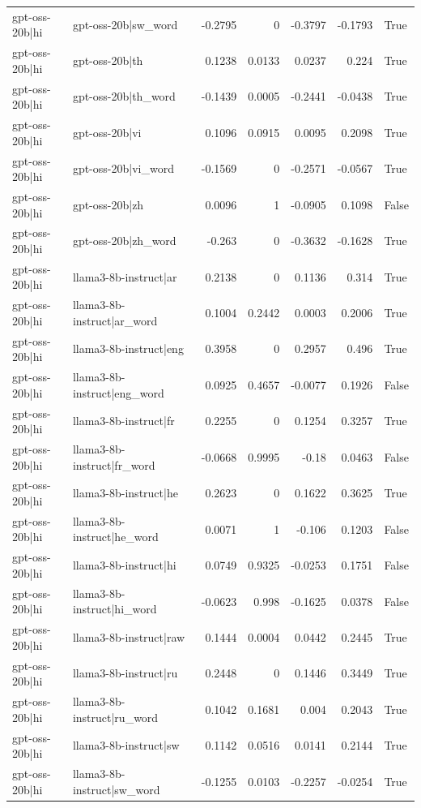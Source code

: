 \begin{table}
\begin{tabular}{l l r r r r l}
gpt-oss-20b|hi & gpt-oss-20b|sw_word & -0.2795 & 0 & -0.3797 & -0.1793 & True \\
gpt-oss-20b|hi & gpt-oss-20b|th & 0.1238 & 0.0133 & 0.0237 & 0.224 & True \\
gpt-oss-20b|hi & gpt-oss-20b|th_word & -0.1439 & 0.0005 & -0.2441 & -0.0438 & True \\
gpt-oss-20b|hi & gpt-oss-20b|vi & 0.1096 & 0.0915 & 0.0095 & 0.2098 & True \\
gpt-oss-20b|hi & gpt-oss-20b|vi_word & -0.1569 & 0 & -0.2571 & -0.0567 & True \\
gpt-oss-20b|hi & gpt-oss-20b|zh & 0.0096 & 1 & -0.0905 & 0.1098 & False \\
gpt-oss-20b|hi & gpt-oss-20b|zh_word & -0.263 & 0 & -0.3632 & -0.1628 & True \\
gpt-oss-20b|hi & llama3-8b-instruct|ar & 0.2138 & 0 & 0.1136 & 0.314 & True \\
gpt-oss-20b|hi & llama3-8b-instruct|ar_word & 0.1004 & 0.2442 & 0.0003 & 0.2006 & True \\
gpt-oss-20b|hi & llama3-8b-instruct|eng & 0.3958 & 0 & 0.2957 & 0.496 & True \\
gpt-oss-20b|hi & llama3-8b-instruct|eng_word & 0.0925 & 0.4657 & -0.0077 & 0.1926 & False \\
gpt-oss-20b|hi & llama3-8b-instruct|fr & 0.2255 & 0 & 0.1254 & 0.3257 & True \\
gpt-oss-20b|hi & llama3-8b-instruct|fr_word & -0.0668 & 0.9995 & -0.18 & 0.0463 & False \\
gpt-oss-20b|hi & llama3-8b-instruct|he & 0.2623 & 0 & 0.1622 & 0.3625 & True \\
gpt-oss-20b|hi & llama3-8b-instruct|he_word & 0.0071 & 1 & -0.106 & 0.1203 & False \\
gpt-oss-20b|hi & llama3-8b-instruct|hi & 0.0749 & 0.9325 & -0.0253 & 0.1751 & False \\
gpt-oss-20b|hi & llama3-8b-instruct|hi_word & -0.0623 & 0.998 & -0.1625 & 0.0378 & False \\
gpt-oss-20b|hi & llama3-8b-instruct|raw & 0.1444 & 0.0004 & 0.0442 & 0.2445 & True \\
gpt-oss-20b|hi & llama3-8b-instruct|ru & 0.2448 & 0 & 0.1446 & 0.3449 & True \\
gpt-oss-20b|hi & llama3-8b-instruct|ru_word & 0.1042 & 0.1681 & 0.004 & 0.2043 & True \\
gpt-oss-20b|hi & llama3-8b-instruct|sw & 0.1142 & 0.0516 & 0.0141 & 0.2144 & True \\
gpt-oss-20b|hi & llama3-8b-instruct|sw_word & -0.1255 & 0.0103 & -0.2257 & -0.0254 & True \\

\end{tabular}
\end{table}

